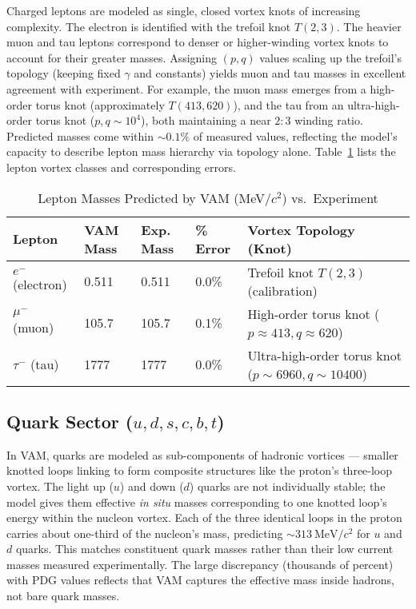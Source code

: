 Charged leptons are modeled as single, closed vortex knots of increasing complexity. The electron is identified with the trefoil knot $T(2,3)$. The heavier muon and tau leptons correspond to denser or higher-winding vortex knots to account for their greater masses. Assigning $(p,q)$ values scaling up the trefoil’s topology (keeping fixed $\gamma$ and constants) yields muon and tau masses in excellent agreement with experiment. For example, the muon mass emerges from a high-order torus knot (approximately $T(413,620)$), and the tau from an ultra-high-order torus knot ($p,q \sim 10^4$), both maintaining a near $2:3$ winding ratio. Predicted masses come within $\sim 0.1\%$ of measured values, reflecting the model’s capacity to describe lepton mass hierarchy via topology alone. Table~\ref{tab:leptons} lists the lepton vortex classes and corresponding errors.

\begin{table}[h!]
    \centering
    \begin{tabular}{lllll}
        \toprule
        \textbf{Lepton} & \textbf{VAM Mass} & \textbf{Exp. Mass} & \textbf{\% Error} & \textbf{Vortex Topology (Knot)} \\
        \midrule
        $e^-$ (electron) & 0.511 & 0.511 & 0.0\% & Trefoil knot $T(2,3)$ (calibration) \\
        $\mu^-$ (muon) & 105.7 & 105.7 & 0.1\% & High-order torus knot ($p \approx 413, q \approx 620$) \\
        $\tau^-$ (tau) & 1777 & 1777 & 0.0\% & Ultra-high-order torus knot ($p \sim 6960, q \sim 10400$) \\
        \bottomrule
    \end{tabular}
    \caption{Lepton Masses Predicted by VAM (MeV/$c^2$) vs.\ Experiment}
    \label{tab:leptons}
\end{table}

\subsection{Quark Sector ($u, d, s, c, b, t$)}

In VAM, quarks are modeled as sub-components of hadronic vortices — smaller knotted loops linking to form composite structures like the proton’s three-loop vortex. The light up ($u$) and down ($d$) quarks are not individually stable; the model gives them effective \textit{in situ} masses corresponding to one knotted loop’s energy within the nucleon vortex. Each of the three identical loops in the proton carries about one-third of the nucleon’s mass, predicting $\sim 313~\mathrm{MeV}/c^2$ for $u$ and $d$ quarks. This matches constituent quark masses rather than their low current masses measured experimentally. The large discrepancy (thousands of percent) with PDG values reflects that VAM captures the effective mass inside hadrons, not bare quark masses.

